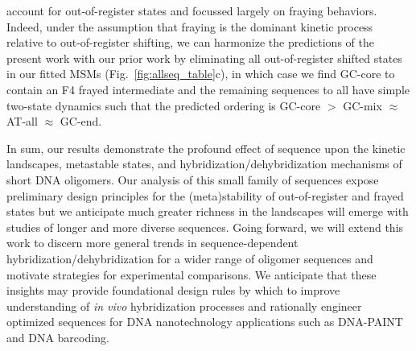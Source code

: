 \documentclass[journal=jpcbfk,manuscript=article]{achemso}
\begin{document}
account for out-of-register states and focussed largely on fraying behaviors. Indeed, under the assumption that fraying is the dominant kinetic process relative to out-of-register shifting, we  can harmonize the predictions of the present work with our prior work by eliminating all out-of-register shifted states in our fitted MSMs (Fig.~\ref{fig:allseq_table}c), in which case we find GC-core to contain an F4 frayed intermediate and the remaining sequences to all have simple two-state dynamics such that the predicted ordering is GC-core $>$ GC-mix $\approx$ AT-all $\approx$ GC-end.

In sum, our results demonstrate the profound effect of sequence upon the kinetic landscapes, metastable states, and hybridization/dehybridization mechanisms of short DNA oligomers. Our analysis of this small family of sequences expose preliminary design principles for the (meta)stability of out-of-register and frayed states but we anticipate much greater richness in the landscapes will emerge with studies of longer and more diverse sequences. Going forward, we will extend this work to discern more general trends in sequence-dependent hybridization/dehybridization for a wider range of oligomer sequences and motivate strategies for experimental comparisons. We anticipate that these insights may provide foundational design rules by which to improve understanding of \emph{in vivo} hybridization processes and rationally engineer optimized sequences for DNA nanotechnology applications such as DNA-PAINT~\citep{Strauss2020UpDNA-PAINT} and DNA barcoding.~\citep{Shah2019} 

\end{document}
